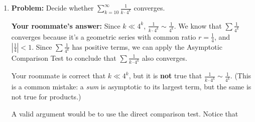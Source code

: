 \documentclass[main]{subfiles}
\begin{document}
\begin{enumerate}
\begin{enumerate}
   \begin{solution}
     Your roommate's reasoning is invalid.  They are correct that $\displaystyle
     \frac{k^2 + 2^k}{k! - k} \sim \frac{2^k}{k!}$ and that $2^k \ll k!$.
     However, the reasoning that $\sum \frac{2^k}{k!}$ converges because
     numerator $\ll$ denominator is incorrect.

     Here's an example which demonstrates that this reasoning is invalid:
     $1 \ll k$, but $\sum \frac{1}{k}$ still diverges.

    We could use the asymptotic comparison test, but apply the ratio test to the simplified series $\displaystyle \sum_{k=10}^\infty 
     \frac{2^k}{k!}$. Notice that

     $$\lim_{k\to \infty} \left|\frac{a_{k+1}}{a_k}\right| = \lim_{k\to \infty} \left|\frac{2^{k+1}}{(k+1)!}\frac{k!}{2^k}\right| = \lim_{k\to \infty} \frac{2}{k+1} = 0 <1$$

     So the series $\displaystyle \sum_{k=10}^\infty \frac{2^k}{k!}$ converges by the ratio test and thus $\displaystyle \sum_{k=10}^\infty \frac{k^2 + 2^k}{k! - k}$ converges by the asymptotic comparison test.
     
   \end{solution}




 \item
   \begin{problem}
     \textbf{Problem:} Decide whether $\displaystyle \sum_{k=10}^\infty
     \frac{1}{k \cdot 4^k}$ converges.

     \textbf{Your roommate's answer:} Since $k \ll 4^k$, $\displaystyle \frac{1}{k
       \cdot 4^k} \sim \frac{1}{4^k}$.  We know that $\sum \frac{1}{4^k}$
     converges because it's a geometric series with common ratio $r=
     \frac{1}{4}$, and $\left|\frac{1}{4} \right| < 1$.  Since $\sum
     \frac{1}{4^k}$ has positive terms, we can apply the Asymptotic
     Comparison Test to conclude that $\sum \frac{1}{k \cdot 4^k}$ also
     converges. 
   \end{problem}

   \begin{solution}
     Your roommate is correct that $k \ll 4^k$, but it is \textbf{not} true that
     $\displaystyle \frac{1}{k \cdot 4^k} \sim \frac{1}{4^k}$.  (This is
     a common mistake: a \textit{sum} is asymptotic to its largest term,
     but the same is not true for products.)

     A valid argument would be to use the direct comparison test. Notice that 


\end{solution}
\end{enumerate}
\end{enumerate}
\end{document}
